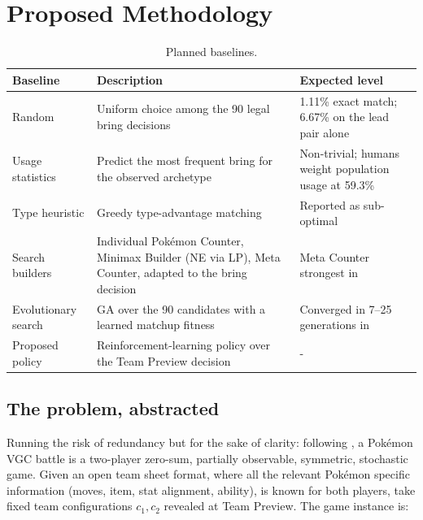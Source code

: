 \documentclass[conference]{IEEEtran}
\begin{document}
\section{Proposed Methodology}
\begin{table}[!t]
\centering
\caption{Planned baselines.}
\label{tab:baselines}
\footnotesize
\setlength{\tabcolsep}{4pt}
\renewcommand{\arraystretch}{1.2}
\begin{tabular}{@{}p{2.4cm}p{3.1cm}p{2.0cm}@{}}
\toprule
\textbf{Baseline} & \textbf{Description} & \textbf{Expected level} \\
\midrule
Random & Uniform choice among the 90 legal bring decisions & 1.11\% exact match; 6.67\% on the lead pair alone \\
Usage statistics & Predict the most frequent bring for the observed archetype & Non-trivial; humans weight population usage at 59.3\% \cite{oblander2025} \\
Type heuristic & Greedy type-advantage matching & Reported as sub-optimal \cite{simoes2020} \\
Search builders & Individual Pok\'emon Counter, Minimax Builder (NE via LP), Meta Counter, adapted to the bring decision & Meta Counter strongest in \cite{reis2024} \\
Evolutionary search & GA over the 90 candidates with a learned matchup fitness & Converged in 7--25 generations in \cite{reis2025} \\
Proposed policy & Reinforcement-learning policy over the Team Preview decision & - \\
\bottomrule
\end{tabular}
\end{table}
\subsection{The problem, abstracted}
Running the risk of redundancy but for the sake of clarity: following \cite{angliss2026}, a Pok\'emon VGC battle is a two-player
zero-sum, partially observable, symmetric, stochastic game. Given an open team sheet format, where all the relevant Pokémon specific information (moves, item, stat alignment, ability), is known for both players, take fixed team
configurations $c_1, c_2$ revealed at Team Preview. The game instance is:
\end{document}
